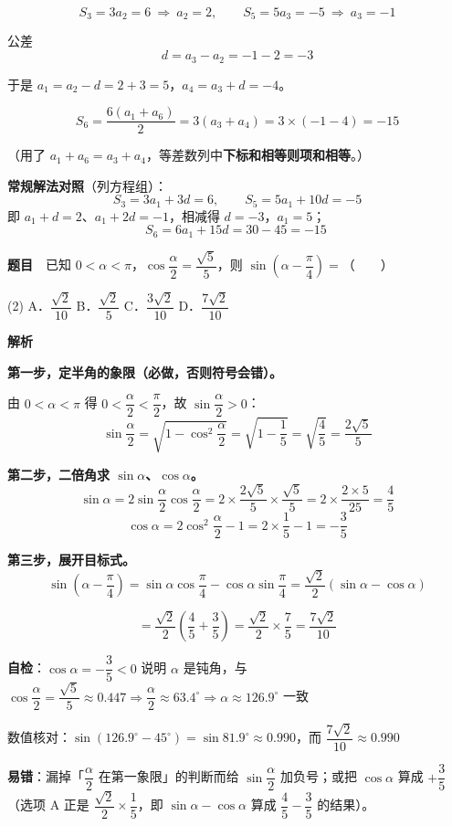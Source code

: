 \[S_3=3a_2=6\ \Longrightarrow\ a_2=2,\qquad S_5=5a_3=-5\ \Longrightarrow\ a_3=-1\]

公差
\[d=a_3-a_2=-1-2=-3\]

于是 $a_1=a_2-d=2+3=5$，$a_4=a_3+d=-4$。

\[S_6=\frac{6\left(a_1+a_6\right)}{2}=3\left(a_3+a_4\right)=3\times(-1-4)=-15\]

（用了 $a_1+a_6=a_3+a_4$，等差数列中\textbf{下标和相等则项和相等}。）


\begin{gktip}
\textbf{常规解法对照}（列方程组）：
\[S_3=3a_1+3d=6,\qquad S_5=5a_1+10d=-5\]
即 $a_1+d=2$、$a_1+2d=-1$，相减得 $d=-3$，$a_1=5$；
\[S_6=6a_1+15d=30-45=-15\ \]
\end{gktip}

\par\medskip


\textbf{题目}　已知 $0<\alpha<\pi$，$\cos\dfrac{\alpha}{2}=\dfrac{\sqrt5}{5}$，则 $\sin\left(\alpha-\dfrac{\pi}{4}\right)=$（　　）

\begin{gkopts}(2)
\task A．$\dfrac{\sqrt2}{10}$
\task B．$\dfrac{\sqrt2}{5}$
\task C．$\dfrac{3\sqrt2}{10}$
\task D．$\dfrac{7\sqrt2}{10}$
\end{gkopts}

\textbf{解析}

\textbf{第一步，定半角的象限（必做，否则符号会错）。}

由 $0<\alpha<\pi$ 得 $0<\dfrac\alpha2<\dfrac\pi2$，故 $\sin\dfrac\alpha2>0$：
\[\sin\frac\alpha2=\sqrt{1-\cos^2\frac\alpha2}=\sqrt{1-\frac15}=\sqrt{\frac45}=\frac{2\sqrt5}{5}\]

\textbf{第二步，二倍角求 $\sin\alpha$、$\cos\alpha$。}
\[\sin\alpha=2\sin\frac\alpha2\cos\frac\alpha2=2\times\frac{2\sqrt5}{5}\times\frac{\sqrt5}{5}=2\times\frac{2\times5}{25}=\frac45\]
\[\cos\alpha=2\cos^2\frac\alpha2-1=2\times\frac15-1=-\frac35\]

\textbf{第三步，展开目标式。}
\[\sin\left(\alpha-\frac\pi4\right)=\sin\alpha\cos\frac\pi4-\cos\alpha\sin\frac\pi4=\frac{\sqrt2}{2}\left(\sin\alpha-\cos\alpha\right)\]

\[=\frac{\sqrt2}{2}\left(\frac45+\frac35\right)=\frac{\sqrt2}{2}\times\frac75=\frac{7\sqrt2}{10}\]


\begin{gktip}
\textbf{自检}：$\cos\alpha=-\dfrac35<0$ 说明 $\alpha$ 是钝角，与 $\cos\dfrac\alpha2=\dfrac{\sqrt5}{5}\approx0.447\Rightarrow\dfrac\alpha2\approx63.4^\circ\Rightarrow\alpha\approx126.9^\circ$ 一致 

数值核对：$\sin\left(126.9^\circ-45^\circ\right)=\sin81.9^\circ\approx0.990$，而 $\dfrac{7\sqrt2}{10}\approx0.990$ 

\textbf{易错}：漏掉「$\dfrac\alpha2$ 在第一象限」的判断而给 $\sin\dfrac\alpha2$ 加负号；或把 $\cos\alpha$ 算成 $+\dfrac35$（选项 A 正是 $\dfrac{\sqrt2}{2}\times\dfrac15$，即 $\sin\alpha-\cos\alpha$ 算成 $\dfrac45-\dfrac35$ 的结果）。
\end{gktip}

